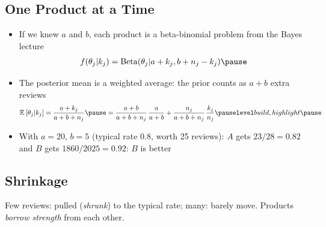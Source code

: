 
\begin{slide}
\section[-1]{One Product at a Time}

\begin{PauseHighLight}
  \begin{itemize}
  \item If we knew $a$ and $b$, each product is a beta-binomial problem
    from the Bayes lecture
    \begin{align*}
      f(\theta_j|k_j) = \mathrm{Beta}(\theta_j|a+k_j, b+n_j-k_j)\pause
    \end{align*}
  \item The posterior mean is a weighted average: the prior counts as
    $a+b$ extra reviews
    \begin{align*}
      \av{\theta_j|k_j} = \frac{a+k_j}{a+b+n_j}\pause
      = \frac{a+b}{a+b+n_j}\,\frac{a}{a+b} +
      \frac{n_j}{a+b+n_j}\,\frac{k_j}{n_j}\pauseb
    \end{align*}
  \item With $a=20$, $b=5$ (typical rate 0.8, worth 25 reviews):
    $A$ gets $23/28 = 0.82$\pause{} and $B$ gets $1860/2025 =
    0.92$\pauseb{}: $B$ is better\pauseb
  \end{itemize}
\end{PauseHighLight}

\end{slide}


\begin{slide}
\section[-2]{Shrinkage}

\pb\pause{}
\begin{center}
  \pause
\end{center}
Few reviews: pulled (\emph{shrunk}) to the typical rate; many: barely
move.  Products \emph{borrow strength} from each other.\pauseh

\end{slide}


